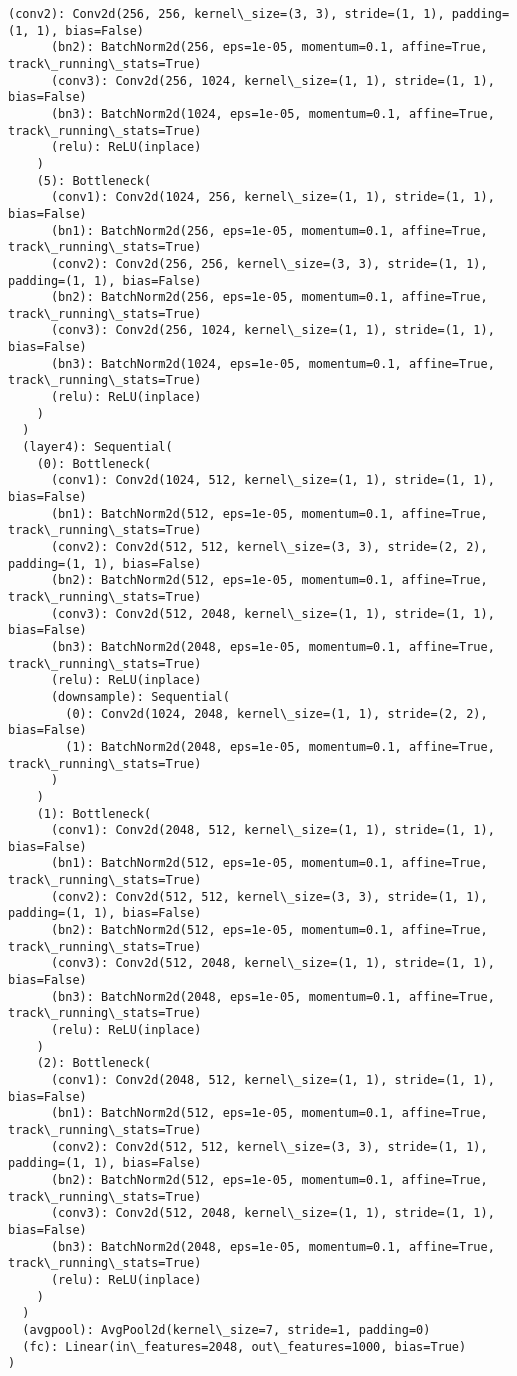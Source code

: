 \documentclass[11pt]{article}
\begin{document}
\begin{Verbatim}[commandchars=\\\{\}]
      (conv2): Conv2d(256, 256, kernel\_size=(3, 3), stride=(1, 1), padding=(1, 1), bias=False)
      (bn2): BatchNorm2d(256, eps=1e-05, momentum=0.1, affine=True, track\_running\_stats=True)
      (conv3): Conv2d(256, 1024, kernel\_size=(1, 1), stride=(1, 1), bias=False)
      (bn3): BatchNorm2d(1024, eps=1e-05, momentum=0.1, affine=True, track\_running\_stats=True)
      (relu): ReLU(inplace)
    )
    (5): Bottleneck(
      (conv1): Conv2d(1024, 256, kernel\_size=(1, 1), stride=(1, 1), bias=False)
      (bn1): BatchNorm2d(256, eps=1e-05, momentum=0.1, affine=True, track\_running\_stats=True)
      (conv2): Conv2d(256, 256, kernel\_size=(3, 3), stride=(1, 1), padding=(1, 1), bias=False)
      (bn2): BatchNorm2d(256, eps=1e-05, momentum=0.1, affine=True, track\_running\_stats=True)
      (conv3): Conv2d(256, 1024, kernel\_size=(1, 1), stride=(1, 1), bias=False)
      (bn3): BatchNorm2d(1024, eps=1e-05, momentum=0.1, affine=True, track\_running\_stats=True)
      (relu): ReLU(inplace)
    )
  )
  (layer4): Sequential(
    (0): Bottleneck(
      (conv1): Conv2d(1024, 512, kernel\_size=(1, 1), stride=(1, 1), bias=False)
      (bn1): BatchNorm2d(512, eps=1e-05, momentum=0.1, affine=True, track\_running\_stats=True)
      (conv2): Conv2d(512, 512, kernel\_size=(3, 3), stride=(2, 2), padding=(1, 1), bias=False)
      (bn2): BatchNorm2d(512, eps=1e-05, momentum=0.1, affine=True, track\_running\_stats=True)
      (conv3): Conv2d(512, 2048, kernel\_size=(1, 1), stride=(1, 1), bias=False)
      (bn3): BatchNorm2d(2048, eps=1e-05, momentum=0.1, affine=True, track\_running\_stats=True)
      (relu): ReLU(inplace)
      (downsample): Sequential(
        (0): Conv2d(1024, 2048, kernel\_size=(1, 1), stride=(2, 2), bias=False)
        (1): BatchNorm2d(2048, eps=1e-05, momentum=0.1, affine=True, track\_running\_stats=True)
      )
    )
    (1): Bottleneck(
      (conv1): Conv2d(2048, 512, kernel\_size=(1, 1), stride=(1, 1), bias=False)
      (bn1): BatchNorm2d(512, eps=1e-05, momentum=0.1, affine=True, track\_running\_stats=True)
      (conv2): Conv2d(512, 512, kernel\_size=(3, 3), stride=(1, 1), padding=(1, 1), bias=False)
      (bn2): BatchNorm2d(512, eps=1e-05, momentum=0.1, affine=True, track\_running\_stats=True)
      (conv3): Conv2d(512, 2048, kernel\_size=(1, 1), stride=(1, 1), bias=False)
      (bn3): BatchNorm2d(2048, eps=1e-05, momentum=0.1, affine=True, track\_running\_stats=True)
      (relu): ReLU(inplace)
    )
    (2): Bottleneck(
      (conv1): Conv2d(2048, 512, kernel\_size=(1, 1), stride=(1, 1), bias=False)
      (bn1): BatchNorm2d(512, eps=1e-05, momentum=0.1, affine=True, track\_running\_stats=True)
      (conv2): Conv2d(512, 512, kernel\_size=(3, 3), stride=(1, 1), padding=(1, 1), bias=False)
      (bn2): BatchNorm2d(512, eps=1e-05, momentum=0.1, affine=True, track\_running\_stats=True)
      (conv3): Conv2d(512, 2048, kernel\_size=(1, 1), stride=(1, 1), bias=False)
      (bn3): BatchNorm2d(2048, eps=1e-05, momentum=0.1, affine=True, track\_running\_stats=True)
      (relu): ReLU(inplace)
    )
  )
  (avgpool): AvgPool2d(kernel\_size=7, stride=1, padding=0)
  (fc): Linear(in\_features=2048, out\_features=1000, bias=True)
)

    \end{Verbatim}
\end{document}
